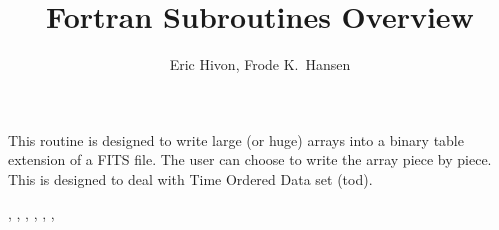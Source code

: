 
\sloppy


\title{\healpix Fortran Subroutines Overview}
 \section[write\_bintabh*]{ }
\label{sub:write_bintabh}
\author{Eric Hivon, Frode K.~Hansen}

\begin{facility}
{This routine is designed to write large (or huge) arrays into a binary table
extension of a FITS file. The user can
choose to write the array piece by piece. This is designed to deal with Time
Ordered Data set (tod).}
{\modFitstools}
\end{facility}

\begin{f90format}
{%
, %
, %
, %
, %
, %
, }
\end{f90format}
\aboutoptional

